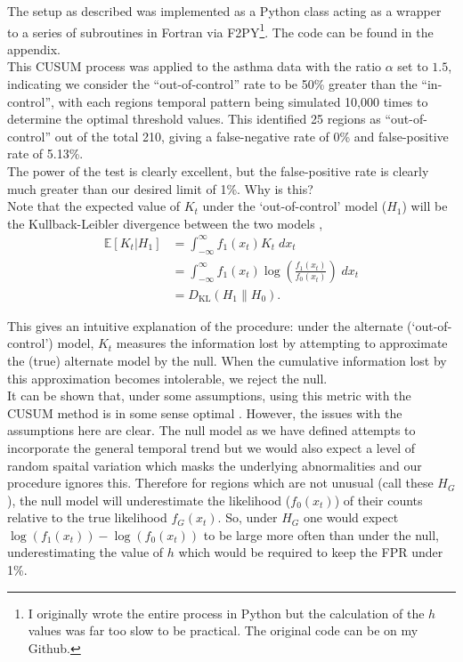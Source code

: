 \documentclass[11pt]{report}
\begin{document}
The setup as described was implemented as a Python class acting as a wrapper to a series of subroutines in Fortran via F2PY\footnote{I originally wrote the entire process in Python but the calculation of the $h$ values was far too slow to be practical. The original code can be on my Github.}. The code can be found in the appendix. \\

This CUSUM process was applied to the asthma data with the ratio $\alpha$ set to $1.5$, indicating we consider the ``out-of-control'' rate to be 50\% greater than the ``in-control'', with each regions temporal pattern being simulated 10,000 times to determine the optimal threshold values. This identified 25 regions as ``out-of-control'' out of the total 210, giving a false-negative rate of 0\% and false-positive rate of 5.13\%. \\

The power of the test is clearly excellent, but the false-positive rate is clearly much greater than our desired limit of 1\%. Why is this? \\  

Note that the expected value of $K_t$ under the `out-of-control' model ($H_1$) will be the Kullback-Leibler divergence between the two models \citep{weighed},
\begin{align*}
\mathbb{E}[K_t | H_1] &= \int_{-\infty}^{\infty} f_1(x_t) K_t \; dx_t \\
                        &= \int_{-\infty}^{\infty} f_1(x_t) \log{\left(\frac{f_1(x_t)}{f_0(x_t)}\right)} \; dx_t \\
                        &= D_{\mathrm{KL}}(H_1\|H_0).
\end{align*}

This gives an intuitive explanation of the procedure: under the alternate (`out-of-control') model, $K_t$ measures the information lost by attempting to approximate the (true) alternate model by the null. When the cumulative information lost by this approximation becomes intolerable, we reject the null. \\

It can be shown that, under some assumptions, using this metric with the CUSUM method is in some sense optimal \citep{ritov1990}. However, the issues with the assumptions here are clear. The null model as we have defined attempts to incorporate the general temporal trend but we would also expect a level of random spaital variation which masks the underlying abnormalities and our procedure ignores this. Therefore for regions which are not unusual (call these $H_G$), the null model will underestimate the likelihood ($f_0(x_t)$) of their counts relative to the true likelihood $f_G(x_t)$. So, under $H_G$ one would expect $\log(f_1(x_t)) - \log(f_0(x_t))$ to be large more often than under the null, underestimating the value of $h$ which would be required to keep the FPR under 1\%. \\
\end{document}
